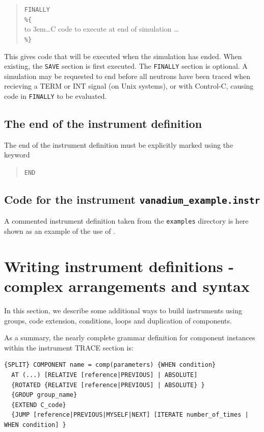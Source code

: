 \begin{quote}
  \texttt{FINALLY} \\
  \verb|%{| \\
  \hbox to 3em{}\ldots C code to execute at end of simulation \ldots \\
  \verb|%}|
\end{quote}
This gives code that will be executed when the simulation has
ended. When existing, the \texttt{SAVE} section is first executed. The
\texttt{FINALLY} section is optional.
A simulation may be requested to end before all neutrons have been
traced when recieving a TERM or INT signal (on Unix systems), or with
Control-C, causing code in \texttt{FINALLY} to be evaluated.
 


\subsection{The end of the instrument definition}
\label{s:end}

The end of the instrument definition must be explicitly marked using the keyword
\begin{quote}
  \texttt{END}
\end{quote}

\subsection{Code for the instrument \texttt{vanadium\_example.instr}}
\label{s:Samples_vanadium.instr}
A commented instrument definition taken from the \texttt{examples} directory is
here shown as an example of the use of \MCS .



\section{Writing instrument definitions - complex arrangements and syntax}
\label{s:instrdefs-extend}

In this section, we describe some additional ways to build instruments using groups, code extension, conditions, loops and duplication of components.

As a summary, the nearly complete grammar definition for component instances within the instrument TRACE section is:

\begin{verbatim}
{SPLIT} COMPONENT name = comp(parameters) {WHEN condition}
  AT (...) [RELATIVE [reference|PREVIOUS] | ABSOLUTE]
  {ROTATED {RELATIVE [reference|PREVIOUS] | ABSOLUTE} }
  {GROUP group_name}
  {EXTEND C_code}
  {JUMP [reference|PREVIOUS|MYSELF|NEXT] [ITERATE number_of_times | WHEN condition] }
\end{verbatim}

